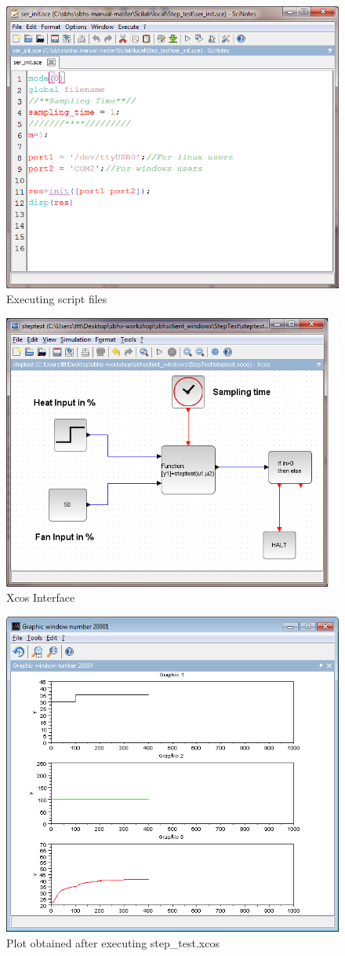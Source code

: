\begin{figure}
\centering
\includegraphics[width=0.7\linewidth]{using-sbhs/ser_init.png}
\caption{Executing script files}
\label{exec}
\end{figure}

\begin{figure}
\centering
\includegraphics[width=0.7\linewidth]{using-sbhs/xcos.png}
\caption{Xcos Interface}
\label{Xcosintr}
\end{figure}



\begin{figure}
\centering
\includegraphics[width=0.7\linewidth]{using-sbhs/plot.png}
\caption{Plot obtained after executing step\_test.xcos}
\label{plots}
\end{figure}

